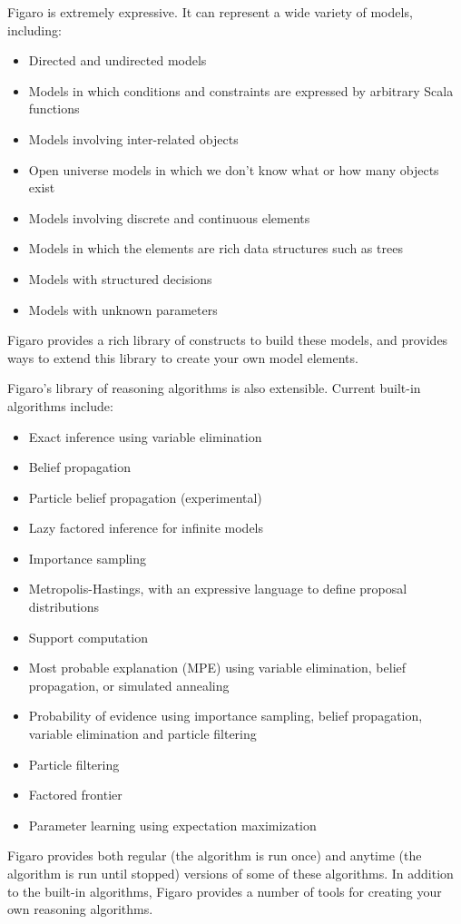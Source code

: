 Figaro is extremely expressive. It can represent a wide variety of models, including:
\begin{itemize}
\item Directed and undirected models
\item Models in which conditions and constraints are expressed by arbitrary Scala functions
\item Models involving inter-related objects
\item Open universe models in which we don't know what or how many objects exist
\item Models involving discrete and continuous elements
\item Models in which the elements are rich data structures such as trees
\item Models with structured decisions
\item Models with unknown parameters
\end{itemize}

Figaro provides a rich library of constructs to build these models, and provides ways to extend this library to create your own model elements.

Figaro's library of reasoning algorithms is also extensible. Current built-in algorithms include:
\begin{itemize}
\item Exact inference using variable elimination
\item Belief propagation
\item Particle belief propagation (experimental)
\item Lazy factored inference for infinite models
\item Importance sampling
\item Metropolis-Hastings, with an expressive language to define proposal distributions
\item Support computation
\item Most probable explanation (MPE) using variable elimination, belief propagation, or simulated annealing
\item Probability of evidence using importance sampling, belief propagation, variable elimination and particle filtering
\item Particle filtering
\item Factored frontier
\item Parameter learning using expectation maximization
\end{itemize}

Figaro provides both regular (the algorithm is run once) and anytime (the algorithm is run until stopped) versions of some of these algorithms. In addition to the built-in algorithms, Figaro provides a number of tools for creating your own reasoning algorithms.

